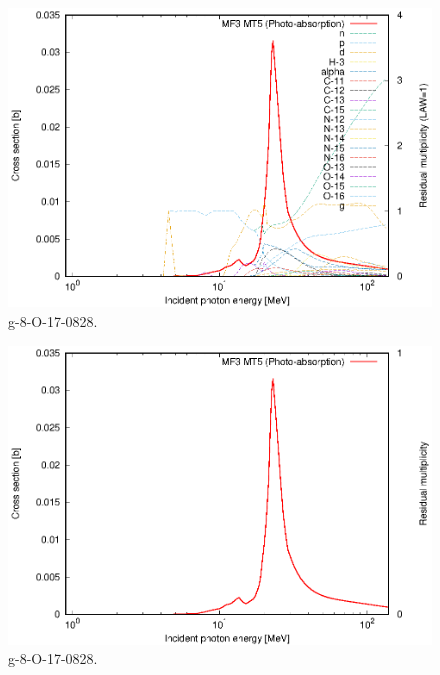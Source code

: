 \begin{figure}
 \includegraphics[width=\linewidth]{eps/g_8-O-17_0828.eps}
  \caption{g-8-O-17-0828.}
\end{figure}
\begin{figure}
 \includegraphics[width=\linewidth]{eps-law0/g_8-O-17_0828.eps}
 \caption{g-8-O-17-0828.}
\end{figure}
\newpage \clearpage

